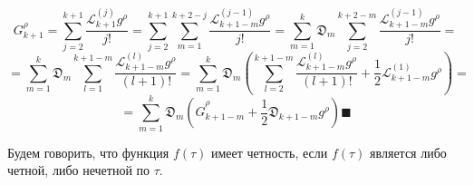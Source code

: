 $$G_{k+1}^\rho = \sum_{j=2}^{k+1} \frac{\mathcal{L}_{k+1}^{(j)} g^\rho }{j!} = \sum_{j=2}^{k+1} \sum_{m=1}^{k+2-j} \frac{\mathcal{L}_{k+1-m}^{(j-1)} g^\rho }{j!} = \sum_{m=1}^k \mathfrak{D}_m \sum_{j=2}^{k+2-m} \frac{\mathcal{L}_{k+1-m}^{(j-1)} g^\rho }{j!} =$$
$$= \sum_{m=1}^k \mathfrak{D}_m \sum_{l=1}^{k+1-m} \frac{\mathcal{L}_{k+1-m}^{(l)} g^\rho }{(l+1)!} = \sum_{m=1}^k \mathfrak{D}_m \left( \sum_{l=2}^{k+1-m} \frac{\mathcal{L}_{k+1-m}^{(l)} g^\rho }{(l+1)!} + \frac12 \mathcal{L}_{k+1-m}^{(1)}g^\rho \right) =$$
$$= \sum_{m=1}^k \mathfrak{D}_m \left( \hat G_{k+1-m}^\rho + \frac12 \mathfrak{D}_{k+1-m}g^\rho \right) \blacksquare$$
\begin{dfn}
Будем говорить, что функция $f(\tau)$ имеет четность, если $f(\tau)$ является либо четной, либо нечетной по $\tau$.
\end{dfn}

